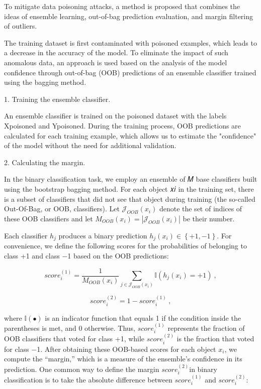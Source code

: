 \begin{multicols}{2}
To mitigate data poisoning attacks, a method is proposed that combines
the ideas of ensemble learning, out-of-bag prediction evaluation, and
margin filtering of outliers.

The training dataset is first contaminated with poisoned examples, which
leads to a decrease in the accuracy of the model. To eliminate the
impact of such anomalous data, an approach is used based on the analysis
of the model confidence through out-of-bag (OOB) predictions of an
ensemble classifier trained using the bagging method.

1. Training the ensemble classifier.

An ensemble classifier is trained on the poisoned dataset with the
labels Xpoisoned and Ypoisoned. During the training process, OOB
predictions are calculated for each training example, which allows us to
estimate the "confidence" of the model without the need for additional
validation.

2. Calculating the margin.

In the binary classification task, we employ an ensemble of 𝑀 base
classifiers built using the bootstrap bagging method. For each object 𝑥𝑖
in the training set, there is a subset of classifiers that did not see
that object during training (the so-called Out-Of-Bag, or OOB,
classifiers). Let \(\mathcal{J}_{OOB}(x_{i})\) denote the set of indices
of these OOB classifiers and let
\(M_{OOB}\left( x_{i} \right) = \left| \mathcal{J}_{OOB}(x_{i}) \right|\)
be their number.

Each classifier \(h_{j}\) produces a binary prediction
\(h_{j}(x_{i}) \in \left\{ + 1, - 1 \right\}\). For convenience, we
define the following scores for the probabilities of belonging to class
+1 and class −1 based on the OOB predictions:

\[score_{i}^{(1)} = \frac{1}{M_{OOB}(x_{i})}\sum_{j \in \mathcal{J}_{OOB}(x_{i})}^{}{\mathbb{I}\left( h_{j}\left( x_{i} \right) = + 1 \right)\ ,}\]

\[score_{i}^{(2)} = 1 - score_{i}^{(1)}\ ,\]

where \(\mathbb{I( \bullet )}\) is an indicator function that equals 1
if the condition inside the parentheses is met, and 0 otherwise. Thus,
\(score_{i}^{(1)}\) represents the fraction of OOB classifiers that
voted for class +1, while \(score_{i}^{(2)}\) is the fraction that voted
for class −1. After obtaining these OOB-based scores for each object
\(x_{i}\), we compute the ``margin,'' which is a measure of the
ensemble's confidence in its prediction. One common way to define the
margin \(score_{i}^{(2)}\)in binary classification is to take the
absolute difference between \(score_{i}^{(1)}\) and \(score_{i}^{(2)}\):


\end{multicols}
